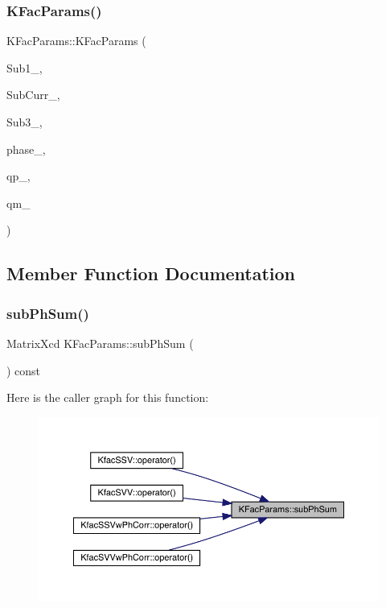 \subsubsection{\texorpdfstring{KFacParams()}{KFacParams()}}
{\footnotesize\ttfamily K\+Fac\+Params\+::\+K\+Fac\+Params (\begin{DoxyParamCaption}\item[{map$<$ int, Eigen\+::\+Matrix\+Xcd $>$}]{Sub1\+\_\+,  }\item[{map$<$ int, Eigen\+::\+Matrix\+Xcd $>$}]{Sub\+Curr\+\_\+,  }\item[{map$<$ int, Eigen\+::\+Matrix\+Xcd $>$}]{Sub3\+\_\+,  }\item[{\mbox{\hyperlink{structPh_1_1phChars}{Ph\+::ph\+Chars}}}]{phase\+\_\+,  }\item[{Vector\+Xd}]{qp\+\_\+,  }\item[{Vector\+Xd}]{qm\+\_\+ }\end{DoxyParamCaption})}



\subsection{Member Function Documentation}
\mbox{\label{classKFacParams_a0f22066b9390b3a28b78d9c679c71f90}} 
\subsubsection{\texorpdfstring{subPhSum()}{subPhSum()}}
{\footnotesize\ttfamily Matrix\+Xcd K\+Fac\+Params\+::sub\+Ph\+Sum (\begin{DoxyParamCaption}{ }\end{DoxyParamCaption}) const\hspace{0.3cm}{\ttfamily [virtual]}}

Here is the caller graph for this function\+:
\nopagebreak
\begin{figure}[H]
\begin{center}
\leavevmode
\includegraphics[width=350pt]{d7/d41/classKFacParams_a0f22066b9390b3a28b78d9c679c71f90_icgraph}
\end{center}
\end{figure}
\mbox{\label{classKFacParams_a023894ddf4ee41134ce512a2bd2a8075}} 
